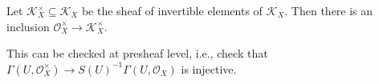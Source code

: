 Let $\mathcal{K}_X^\times \subseteq \mathcal{K}_X$ be the sheaf of invertible
elements of $\mathcal{K}_X$. Then there is an inclusion
$\mathcal{O}_X^\times\to \mathcal{K}_X^\times$.

This can be checked at presheaf level, i.e., check that $\Gamma(U, \mathcal{O}_X^\times)\to S(U)^{-1}\Gamma(U, \mathcal{O}_X)$ is injective.

